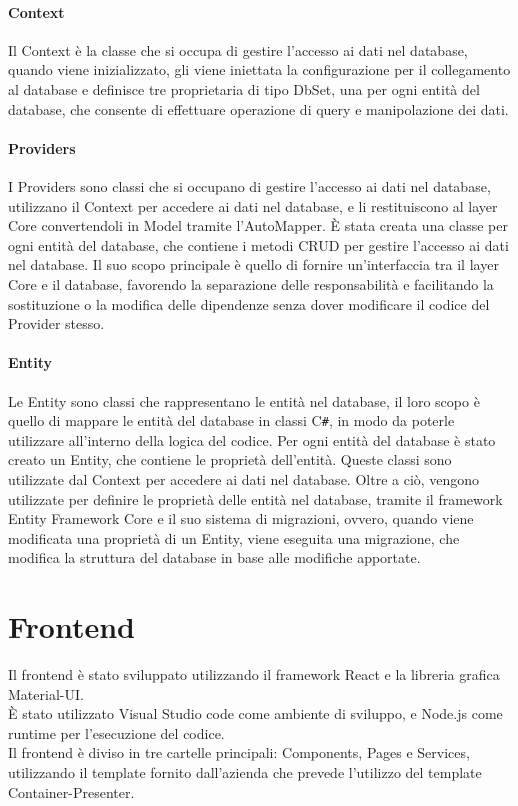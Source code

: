 \paragraph{Context}
Il Context è la classe che si occupa di gestire l'accesso ai dati nel database, quando viene inizializzato, gli viene iniettata la configurazione per il collegamento al database e definisce tre proprietaria di tipo DbSet, una per ogni entità del database, che consente di effettuare operazione di query e manipolazione dei dati.\\

\paragraph{Providers}
I Providers sono classi che si occupano di gestire l'accesso ai dati nel database, utilizzano il Context per accedere ai dati nel database, e li restituiscono al layer Core convertendoli in Model tramite l'AutoMapper. È stata creata una classe per ogni entità del database, che contiene i metodi CRUD per gestire l'accesso ai dati nel database. Il suo scopo principale è quello di fornire un'interfaccia tra il layer Core e il database, favorendo la separazione delle responsabilità e facilitando la sostituzione o la modifica delle dipendenze senza dover modificare il codice del Provider stesso.\\

\paragraph{Entity}
Le Entity sono classi che rappresentano le entità nel database, il loro scopo è quello di mappare le entità del database in classi C\texttt{\#}, in modo da poterle utilizzare all'interno della logica del codice. Per ogni entità del database è stato creato un Entity, che contiene le proprietà dell'entità. Queste classi sono utilizzate dal Context per accedere ai dati nel database. Oltre a ciò, vengono utilizzate per definire le proprietà delle entità nel database, tramite il framework Entity Framework Core e il suo sistema di migrazioni, ovvero, quando viene modificata una proprietà di un Entity, viene eseguita una migrazione, che modifica la struttura del database in base alle modifiche apportate.\\

\section{Frontend}
Il frontend è stato sviluppato utilizzando il framework React e la libreria grafica Material-UI.\\
È stato utilizzato Visual Studio code come ambiente di sviluppo, e Node.js come runtime per l'esecuzione del codice.\\
Il frontend è diviso in tre cartelle principali: Components, Pages e Services, utilizzando il template fornito dall'azienda che prevede l'utilizzo del template Container-Presenter.\\

